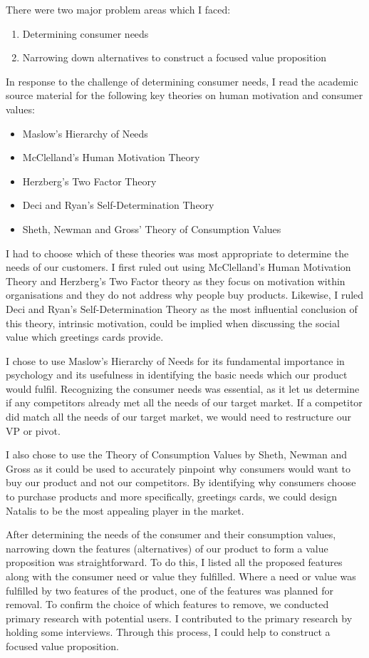 \documentclass[10pt, a4paper]{article}
\begin{document}
\begin{appendices}
There were two major problem areas which I faced:
\begin{enumerate}
  \item Determining consumer needs
  \item Narrowing down alternatives to construct a focused value proposition
\end{enumerate}
In response to the challenge of determining consumer needs, I read the academic source material for the following key theories on human motivation and consumer values:
\begin{itemize}
  \item Maslow's Hierarchy of Needs
  \item McClelland's Human Motivation Theory
  \item Herzberg's Two Factor Theory
  \item Deci and Ryan's Self-Determination Theory
  \item Sheth, Newman and Gross' Theory of Consumption Values
\end{itemize}

I had to choose which of these theories was most appropriate to determine the needs of our customers. I first ruled out using McClelland's Human Motivation Theory and Herzberg's Two Factor theory as they focus on motivation within organisations and they do not address why people buy products. Likewise, I ruled Deci and Ryan's Self-Determination Theory as the most influential conclusion of this theory, intrinsic motivation, could be implied when discussing the social value \citep{sheth1991we} which greetings cards provide.

I chose to use Maslow's Hierarchy of Needs for its fundamental importance in psychology and its usefulness in identifying the basic needs which our product would fulfil. Recognizing the consumer needs was essential, as it let us determine if any competitors already met all the needs of our target market. If a competitor did match all the needs of our target market, we would need to restructure our VP or pivot.

I also chose to use the Theory of Consumption Values by Sheth, Newman and Gross as it could be used to accurately pinpoint why consumers would want to buy our product and not our competitors. By identifying why consumers choose to purchase products and more specifically, greetings cards, we could design Natalis to be the most appealing player in the market.

After determining the needs of the consumer and their consumption values, narrowing down the features (alternatives) of our product to form a value proposition was straightforward. To do this, I listed all the proposed features along with the consumer need or value they fulfilled. Where a need or value was fulfilled by two features of the product, one of the features was planned for removal. To confirm the choice of which features to remove, we conducted primary research with potential users. I contributed to the primary research by holding some interviews. Through this process, I could help to construct a focused value proposition.


\end{appendices}
\end{document}
